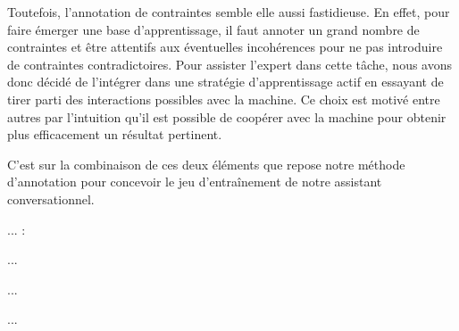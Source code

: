 	Toutefois, l'annotation de contraintes semble elle aussi fastidieuse.
	En effet, pour faire émerger une base d'apprentissage, il faut annoter un grand nombre de contraintes et être attentifs aux éventuelles incohérences pour ne pas introduire de contraintes contradictoires.
	Pour assister l'expert dans cette tâche, nous avons donc décidé de l'intégrer dans une stratégie d'apprentissage actif en essayant de tirer parti des interactions possibles avec la machine.
	Ce choix est motivé entre autres par l'intuition qu'il est possible de coopérer avec la machine pour obtenir plus efficacement un résultat pertinent.

	C'est sur la combinaison de ces deux éléments que repose notre méthode d'annotation pour concevoir le jeu d'entraînement de notre assistant conversationnel.
	
	\begin{leftBarSummary}
		... :
		\begin{todolist}
			\item[\itemok] ...
			\item[\itemok] ...
			\item[\itemok] ...
		\end{todolist}
	\end{leftBarSummary}